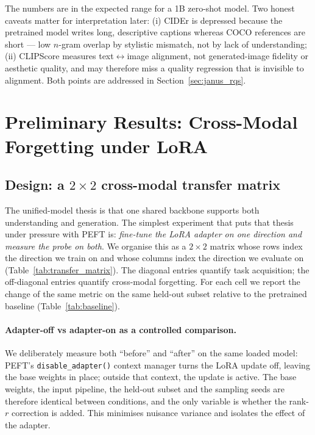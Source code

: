 The numbers are in the expected range for a 1B zero-shot model. Two honest
caveats matter for interpretation later: (i) CIDEr is depressed because the
pretrained model writes long, descriptive captions whereas COCO references
are short --- low $n$-gram overlap by stylistic mismatch, not by lack of
understanding; (ii) CLIPScore measures text$\leftrightarrow$image alignment,
not generated-image fidelity or aesthetic quality, and may therefore miss a
quality regression that is invisible to alignment. Both points are addressed
in Section~\ref{sec:janus_rqs}.

\section{Preliminary Results: Cross-Modal Forgetting under LoRA}
\label{sec:prelim_forgetting}

\subsection{Design: a $2\times2$ cross-modal transfer matrix}

The unified-model thesis is that one shared backbone supports both
understanding and generation. The simplest experiment that puts that thesis
under pressure with PEFT is: \emph{fine-tune the LoRA adapter on one direction
and measure the probe on both}. We organise this as a $2\times2$ matrix whose
rows index the direction we train on and whose columns index the direction we
evaluate on (Table~\ref{tab:transfer_matrix}). The diagonal entries quantify
task acquisition; the off-diagonal entries quantify cross-modal forgetting.
For each cell we report the change of the same metric on the same held-out
subset relative to the pretrained baseline (Table~\ref{tab:baseline}).

\paragraph{Adapter-off vs adapter-on as a controlled comparison.}
We deliberately measure both ``before'' and ``after'' on the same loaded
model: PEFT's \texttt{disable\_adapter()} context manager turns the LoRA
update off, leaving the base weights in place; outside that context, the
update is active. The base weights, the input pipeline, the held-out subset
and the sampling seeds are therefore identical between conditions, and the
only variable is whether the rank-$r$ correction is added. This minimises
nuisance variance and isolates the effect of the adapter.

